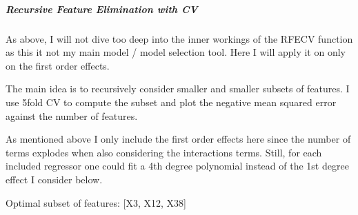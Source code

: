 \documentclass[letterpaper,10pt,english]{sphinxmanual}
\begin{document}
\subparagraph{Recursive Feature Elimination with CV}
\label{\detokenize{simulated_reverse_engineering:recursive-feature-elimination-with-cv}}
As above, I will not dive too deep into the inner workings of the RFECV function as this it not my main model / model selection tool. Here I will apply it on only on the first order effects.

The main idea is to recursively consider smaller and smaller subsets of features. I use 5\sphinxhyphen{}fold CV to compute the  subset and plot the negative mean squared error against the number of features.

 As mentioned above I only include the first order effects here since the number of terms explodes when also considering the interactions terms. Still, for each included regressor one could fit a 4th degree polynomial instead of the 1st degree effect I consider below.

\begin{sphinxVerbatim}[commandchars=\\\{\}]
  
     
 
 \PYG{p}{[}\PYG{p}{]}
\end{sphinxVerbatim}

\begin{sphinxVerbatim}[commandchars=\\\{\}]
Optimal subset of features:  [\PYGZsq{}X3\PYGZsq{}, \PYGZsq{}X12\PYGZsq{}, \PYGZsq{}X38\PYGZsq{}]
\end{sphinxVerbatim}

\begin{sphinxVerbatim}[commandchars=\\\{\}]
    
\end{sphinxVerbatim}
\end{document}
